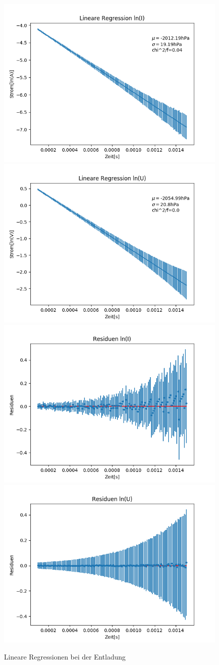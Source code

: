 \documentclass[12pt,a4paper]{article}
\begin{document}
\begin{figure}
\begin{center}
\includegraphics[width=0.49\linewidth]{Bilder/Kondensator_ent_linI}
\includegraphics[width=0.49\linewidth]{Bilder/Kondensator_ent_linU}
\includegraphics[width=0.49\linewidth]{Bilder/Kondensator_ent_resI}
\includegraphics[width=0.49\linewidth]{Bilder/Kondensator_ent_resU}
\caption[Rohdaten logarith. A]{Lineare Regressionen bei der Entladung}
\label{fig:linEnt}
\end{center}
\end{figure}
\end{document}
